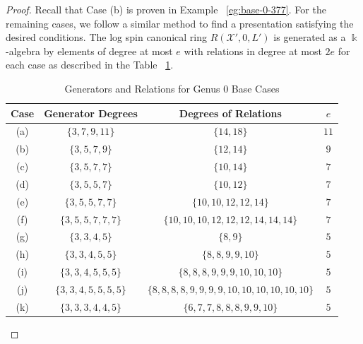 \documentclass{amsart}
\theoremstyle{plain}
\theoremstyle{definition}
\theoremstyle{remark}
\numberwithin{equation}{section}
\newcommand\Bk{{\Bbbk}}
\newcommand\sx{\mathscr X}
\begin{document}
\begin{proof}
Recall that Case (b) is proven in Example ~\ref{eg:base-0-377}. For
the remaining cases, we follow a similar method to find a
presentation satisfying the desired conditions. The log spin
canonical ring $R(\sx', 0, L')$ is generated as a $\Bk$-algebra by
elements of degree at most $e$ with relations in degree at most $2e$
for each case as described in the Table ~\ref{table:g-0-base-cases-degrees}.
\begin{table}
\begin{tabular}
	{| c || c | c | c |}
	\hline
	Case & Generator Degrees & Degrees of Relations & $e$\\
	\hline
	\hline

	(a) & $\{3, 7, 9, 11\}$ & $\{14, 18\}$ & $11$ \\	\hline

	(b) & $\{3, 5, 7, 9\}$ & $\{12, 14\}$ & $9$ \\ \hline

	(c) & $\{3, 5, 7, 7\}$ & $\{10, 14\}$ & $7$ \\ \hline
	
	(d) & $\{3, 5, 5, 7\}$ & $\{10, 12\}$	& $7$ \\ \hline
	
	(e) & $\{3, 5, 5, 7, 7\}$ & $\{10, 10, 12, 12, 14\}$	& $7$ \\ \hline
	
	(f) & $\{3, 5, 5, 7, 7, 7\}$ & $\{10, 10, 10, 12, 12, 12, 14, 14, 14\}$	& $7$ \\ \hline

	(g) & $\{3, 3, 4, 5\}$ & $\{8, 9\}$ & $5$ \\ \hline
	
	(h) & $\{3, 3, 4, 5, 5\}$ & $\{8, 8, 9, 9, 10\}$ & $5$ \\ \hline
	
	(i) & $\{3, 3, 4, 5, 5, 5\}$ &
	$\{8, 8, 8, 9, 9, 9, 10, 10, 10\}$ & $5$ \\ \hline
	
	(j) & $\{3, 3, 4, 5, 5, 5, 5\}$ &
	$\{8, 8, 8, 8, 9, 9, 9, 9, 10, 10, 10, 10, 10, 10\}$ & $5$ \\ \hline

	(k) &	$\{3, 3, 3, 4, 4, 5\}$ & $\{6, 7, 7, 8, 8, 8, 9, 9, 10\}$ & $5$ \\ \hline
\end{tabular}

\caption{Generators and Relations for Genus 0 Base Cases}
\label{table:g-0-base-cases-degrees}
\end{table}


\end{proof}
\end{document}
